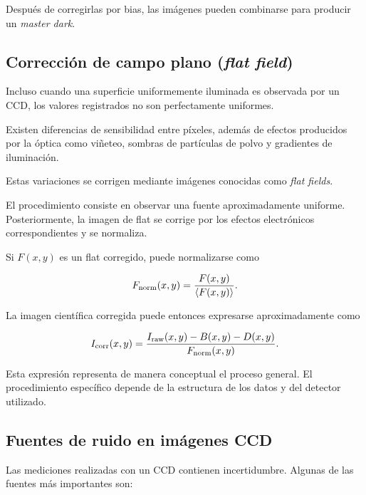 \documentclass[12pt,letterpaper,oneside]{book}
\begin{document}
Después de corregirlas por bias, las imágenes pueden combinarse para producir un \textit{master dark}.



\subsection{Corrección de campo plano (\textit{flat field})}

Incluso cuando una superficie uniformemente iluminada es observada por un CCD, los valores registrados no son perfectamente uniformes.

Existen diferencias de sensibilidad entre píxeles, además de efectos producidos por la óptica como viñeteo, sombras de partículas de polvo y gradientes de iluminación.

Estas variaciones se corrigen mediante imágenes conocidas como \textit{flat fields}.

El procedimiento consiste en observar una fuente aproximadamente uniforme. Posteriormente, la imagen de flat se corrige por los efectos electrónicos correspondientes y se normaliza.

Si $F(x,y)$ es un flat corregido, puede normalizarse como

\[
F_{\rm norm}(x,y)
=
\frac{F(x,y)}
{\langle F(x,y)\rangle}.
\]

La imagen científica corregida puede entonces expresarse aproximadamente como

\begin{equation}
I_{\rm corr}(x,y)
=
\frac{
I_{\rm raw}(x,y)
-
B(x,y)
-
D(x,y)
}
{
F_{\rm norm}(x,y)
}.
\end{equation}

Esta expresión representa de manera conceptual el proceso general. El procedimiento específico depende de la estructura de los datos y del detector utilizado.



\subsection{Fuentes de ruido en imágenes CCD}

Las mediciones realizadas con un CCD contienen incertidumbre. Algunas de las fuentes más importantes son:
\end{document}
